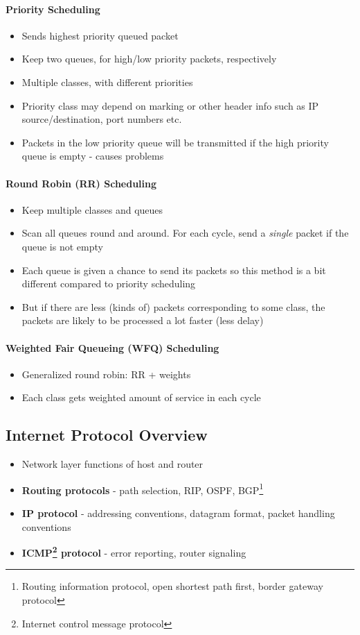 \paragraph{Priority Scheduling}
\begin{itemize}
	\item Sends highest priority queued packet
	\item Keep two queues, for high/low priority packets, respectively
	\item Multiple classes, with different priorities
	\item Priority class may depend on marking or other header info such as IP source/destination, port numbers etc.
	\item Packets in the low priority queue will be transmitted if the high priority queue is empty - causes problems
\end{itemize}

\paragraph{Round Robin (RR) Scheduling}
\begin{itemize}
	\item Keep multiple classes and queues
	\item Scan all queues round and around. For each cycle, send a \textit{single} packet if the queue is not empty
	\item Each queue is given a chance to send its packets so this method is a bit different compared to priority scheduling
	\item But if there are less (kinds of) packets corresponding to some class, the packets are likely to be processed a lot faster (less delay)
\end{itemize}

\paragraph{Weighted Fair Queueing (WFQ) Scheduling}
\begin{itemize}
	\item Generalized round robin: RR + weights
	\item Each class gets weighted amount of service in each cycle
\end{itemize}

\subsection{Internet Protocol Overview}
\begin{itemize}
	\item Network layer functions of host and router
	\item \textbf{Routing protocols} - path selection, RIP, OSPF, BGP\footnote{Routing information protocol, open shortest path first, border gateway protocol}
	\item \textbf{IP protocol} - addressing conventions, datagram format, packet handling conventions
	\item \textbf{ICMP\footnote{Internet control message protocol} protocol} - error reporting, router signaling
\end{itemize}

